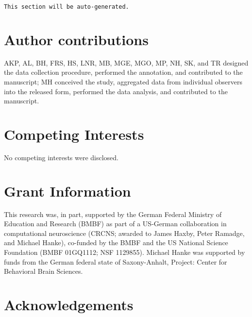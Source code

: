\documentclass[10pt,a4paper,twocolumn]{article}
\begin{document}
\texttt{This section will be auto-generated.}


\section*{Author contributions}
AKP, AL, BH, FRS, HS, LNR, MB, MGE, MGO, MP, NH, SK, and TR designed the data
collection procedure, performed the annotation, and contributed to the
manuscript; MH conceived the study, aggregated data from individual observers
into the released form, performed the data analysis, and contributed to the
manuscript.

\section*{Competing Interests}
No competing interests were disclosed.

\section*{Grant Information}

This research was, in part, supported by the German Federal Ministry of
Education and Research (BMBF) as part of a US-German collaboration in
computational neuroscience (CRCNS; awarded to James Haxby, Peter Ramadge, and
Michael Hanke), co-funded by the BMBF and the US National Science Foundation
(BMBF 01GQ1112; NSF 1129855). Michael Hanke was supported by funds from the
German federal state of Saxony-Anhalt, Project: Center for Behavioral Brain
Sciences.

\section*{Acknowledgements}
\end{document}
